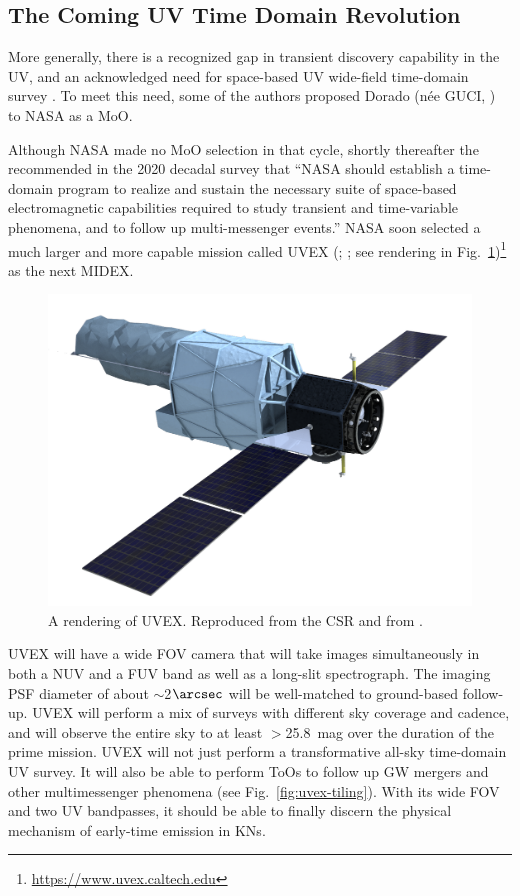 \documentclass[twocolumn,times]{aastex631}
\begin{document}
\subsection{The Coming UV Time Domain Revolution}

More generally, there is a recognized gap in transient discovery capability in the \ac{UV}, and an acknowledged need for space-based \ac{UV} wide-field time-domain survey \citep{2014AJ....147...79S}. To meet this need, some of the authors proposed Dorado (n\'{e}e GUCI, \citealt{2019AAS...23421203C,2023ApJ...944..126D}) to NASA as a \ac{MoO}.

Although NASA made no \ac{MoO} selection in that cycle, shortly thereafter the \citet{2021pdaa.book.....N} recommended in the 2020 decadal survey that ``NASA should establish a time-domain program to realize and sustain the necessary suite of space-based electromagnetic capabilities required to study transient and time-variable phenomena, and to follow up multi-messenger events.'' NASA soon selected a much larger and more capable mission called \acl{UVEX} (; \citealt{2021arXiv211115608K}; see rendering in Fig.~\ref{fig:render})\footnote{\url{https://www.uvex.caltech.edu}} as the next \ac{MIDEX}.

\begin{figure}
    \includegraphics[width=\columnwidth]{figures/UVEXrender}
    \caption{\label{fig:render}A rendering of \ac{UVEX}. Reproduced from the \ac{CSR} and from \citet{2021arXiv211115608K}.}
\end{figure}

\ac{UVEX} will have a wide \ac{FOV} camera that will take images simultaneously in both a \ac{NUV} and a \ac{FUV} band as well as a long-slit spectrograph. The imaging \ac{PSF} diameter of about $\sim$2$\arcsec$ will be well-matched to ground-based follow-up. \ac{UVEX} will perform a mix of surveys with different sky coverage and cadence, and will observe the entire sky to at least $>$25.8~mag over the duration of the prime mission. \ac{UVEX} will not just perform a transformative all-sky time-domain \ac{UV} survey. It will also be able to perform \acp{ToO} to follow up \ac{GW} mergers and other multimessenger phenomena (see Fig.~\ref{fig:uvex-tiling}). With its wide \ac{FOV} and two \ac{UV} bandpasses, it should be able to finally discern the physical mechanism of early-time emission in \acp{KN}.
\end{document}
